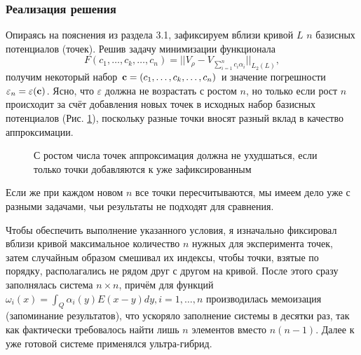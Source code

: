 \documentclass[a4paper]{article}
\newcommand{\V}[1]{\int_Q #1(y) E(x-y) dy}
\begin{document}
\subsubsection{Реализация решения}
Опираясь на пояснения из раздела 3.1, зафиксируем вблизи кривой $L$ $n$ базисных потенциалов (точек).
Решив задачу минимизации функционала
\begin{equation*}
  F(c_1,\dots,c_k,\dots,c_n)=||V_{\rho}-V_{\sum_{i=1}^n c_i \alpha_i}||_{L_2(L)},
\end{equation*}
получим некоторый набор ${\bf c}=(c_1,\dots,c_k,\dots,c_n)$ и значение погрешности $\varepsilon_n = \varepsilon ({\bf c})$.
Ясно, что $\varepsilon$ должна не возрастать с ростом $n$, но только если рост $n$ происходит за счёт добавления новых точек в исходных набор базисных потенциалов (Рис. \ref{points2}),
поскольку разные точки вносят разный вклад в качество аппроксимации.
\begin{figure}[h!]
  \noindent{}
  \caption{С ростом числа точек аппроксимация должна не ухудшаться, если только точки добавляются к уже зафиксированным}
  \label{points2}
\end{figure}

Если же при каждом новом $n$ все точки пересчитываются, мы имеем дело уже с разными задачами, чьи результаты не подходят для сравнения.

Чтобы обеспечить выполнение указанного условия, я изначально фиксировал вблизи кривой максимальное количество $n$ нужных для эксперимента точек,
затем случайным образом смешивал их индексы, чтобы точки, взятые по порядку, располагались не рядом друг с другом на кривой.
После этого сразу заполнялась система $n \times n$, причём для функций $\omega_i(x) =\V{\alpha_i}, i=1,\dots,n$ производилась мемоизация (запоминание результатов), что ускоряло заполнение системы в десятки раз, так как
фактически требовалось найти лишь $n$ элементов вместо $n(n-1)$.
Далее к уже готовой системе применялся ультра-гибрид.
\end{document}
